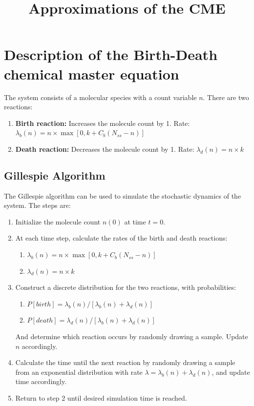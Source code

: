 \documentclass[]{article}
\title{Approximations of the CME}
\author{}
\begin{document}
\maketitle

\section{Description of the Birth-Death chemical master equation}
The system consists of a molecular species with a count variable \(n\). There are two reactions:
\begin{enumerate}
	\item \textbf{Birth reaction:} Increases the molecule count by 1. Rate: \(\lambda_b(n) = n \times \max[0, k+C_b(N_{ss}-n)]\)
	\item \textbf{Death reaction:} Decreases the molecule count by 1. Rate: \(\lambda_d(n) = n \times k\)
\end{enumerate}

\subsection{Gillespie Algorithm}
The Gillespie algorithm can be used to simulate the stochastic dynamics of the system. The steps are:

\begin{enumerate}
	\item Initialize the molecule count \(n(0)\) at time \(t=0\).
	
	\item At each time step, calculate the rates of the birth and death reactions:
	\begin{enumerate}
		\item \(\lambda_b(n) = n \times \max[0, k+C_b(N_{ss}-n)]\)
		\item \(\lambda_d(n) = n \times k\)
	\end{enumerate}
	
	
	\item Construct a discrete distribution for the two reactions, with probabilities:
	
	\begin{enumerate}
		\item $ P[birth] = \lambda_b(n)/[\lambda_b(n) + \lambda_d(n)] $
		\item $ P[death] = \lambda_d(n)/[\lambda_b(n) + \lambda_d(n)] $
	\end{enumerate}
	
	And determine which reaction occurs by randomly drawing a sample. Update $n$ accordingly. 
	
	\item Calculate the time until the next reaction by randomly drawing a sample from an exponential distribution with rate $\lambda = \lambda_b(n) + \lambda_d(n)$, and update time accordingly. 
	
	\item Return to step 2 until desired simulation time is reached.
\end{enumerate}
\end{document}

